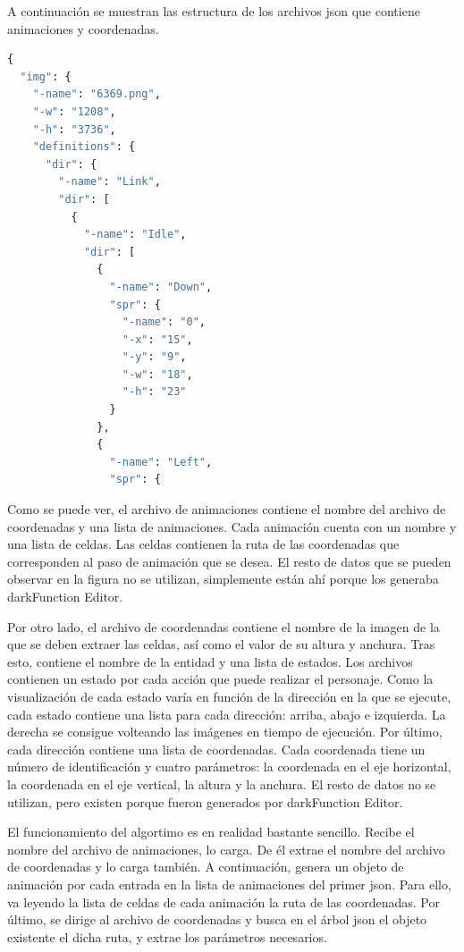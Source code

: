 		A continuación se muestran las estructura de los archivos \acrshort{json} que contiene animaciones y coordenadas.

		\begin{center}
		\begin{minipage}{.6\textwidth}
		\begin{lstlisting}[caption={Estructura de las animaciones en \acrshort{json}},label={lst:animjson},language=Python]
{
  "img": {
    "-name": "6369.png",
    "-w": "1208",
    "-h": "3736",
    "definitions": {
      "dir": {
        "-name": "Link",
        "dir": [
          {
            "-name": "Idle",
            "dir": [
              {
                "-name": "Down",
                "spr": {
                  "-name": "0",
                  "-x": "15",
                  "-y": "9",
                  "-w": "18",
                  "-h": "23"
                }
              },
              {
                "-name": "Left",
                "spr": {
		\end{lstlisting}
		\end{minipage}
		\end{center}

		Como se puede ver, el archivo de animaciones contiene el nombre del archivo de coordenadas y una lista de animaciones. Cada animación cuenta con un nombre y una lista de celdas. Las celdas contienen la ruta de las coordenadas que corresponden al paso de animación que se desea. El resto de datos que se pueden observar en la figura no se utilizan, simplemente están ahí porque los generaba darkFunction Editor.

		Por otro lado, el archivo de coordenadas contiene el nombre de la imagen de la que se deben extraer las celdas, así como el valor de su altura y anchura. Tras esto, contiene el nombre de la entidad y una lista de estados. Los archivos contienen un estado por cada acción que puede realizar el personaje. Como la visualización de cada estado varía en función de la dirección en la que se ejecute, cada estado contiene una lista para cada dirección: arriba, abajo e izquierda. La derecha se consigue volteando las imágenes en tiempo de ejecución. Por último, cada dirección contiene una lista de coordenadas. Cada coordenada tiene un número de identificación y cuatro parámetros: la coordenada en el eje horizontal, la coordenada en el eje vertical, la altura y la anchura. El resto de datos no se utilizan, pero existen porque fueron generados por darkFunction Editor.

		El funcionamiento del algortimo es en realidad bastante sencillo. Recibe el nombre del archivo de animaciones, lo carga. De él extrae el nombre del archivo de coordenadas y lo carga también. A continuación, genera un objeto de animación por cada entrada en la lista de animaciones del primer \acrshort{json}. Para ello, va leyendo la lista de celdas de cada animación la ruta de las coordenadas. Por último, se dirige al archivo de coordenadas y busca en el árbol \acrshort{json} el objeto existente el dicha ruta, y extrae los parámetros necesarios.

